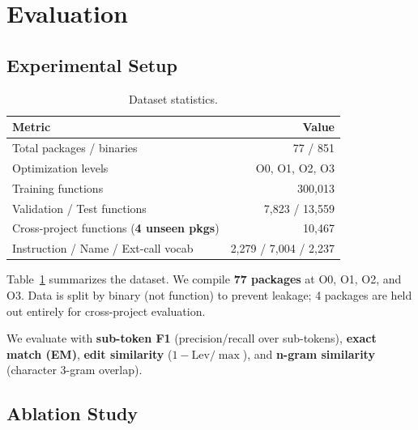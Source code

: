 \documentclass[sigconf,nonacm]{acmart}
\begin{document}
\section{Evaluation}
\label{sec:eval}

\subsection{Experimental Setup}

\begin{table}[t]
    \centering
    \caption{Dataset statistics.}
    \label{tab:dataset}
    \footnotesize
    \begin{tabular}{lr}
        \toprule
        \textbf{Metric} & \textbf{Value} \\
        \midrule
        Total packages / binaries & 77 / 851 \\
        Optimization levels & O0, O1, O2, O3 \\
        Training functions & 300{,}013 \\
        Validation / Test functions & 7{,}823 / 13{,}559 \\
        Cross-project functions (\textbf{4 unseen pkgs}) & 10{,}467 \\
        Instruction / Name / Ext-call vocab & 2,279 / 7{,}004 / 2{,}237 \\
        \bottomrule
    \end{tabular}
\end{table}

Table~\ref{tab:dataset} summarizes the dataset. We compile \textbf{77 packages} at O0, O1, O2, and O3. Data is split by binary (not function) to prevent leakage; 4 packages are held out entirely for cross-project evaluation.

We evaluate with \textbf{sub-token F1} (precision/recall over sub-tokens), \textbf{exact match (EM)}, \textbf{edit similarity} ($1 - \text{Lev}/\max$), and \textbf{n-gram similarity} (character 3-gram overlap).

\subsection{Ablation Study}
\end{document}

